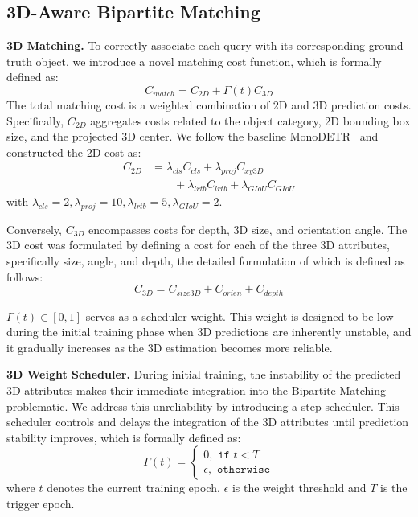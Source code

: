 \subsection{3D-Aware Bipartite Matching}
\textbf{3D Matching.} To correctly associate each query with its corresponding ground-truth object, we introduce a novel matching cost function, which is formally defined as:
\begin{equation}
    C_{match}=C_{2D} + \Gamma(t) C_{3D}
    \label{eq:matching_eq}
\end{equation}
The total matching cost is a weighted combination of 2D and 3D prediction costs. Specifically, $C_{2D}$ aggregates costs related to the object category, 2D bounding box size, and the projected 3D center. We follow the baseline MonoDETR~\cite{MonoDETR} and constructed the 2D cost as:
\begin{equation}
    \begin{aligned}
        C_{2D} & =\lambda_{cls}C_{cls} + \lambda_{proj}C_{xy3D} \\
        & \hspace{2em} + \lambda_{lrtb}C_{lrtb} + \lambda_{GIoU}C_{GIoU}
    \end{aligned}
\end{equation}
with $\lambda_{cls}=2, \lambda_{proj}=10, \lambda_{lrtb} = 5, \lambda_{GIoU} = 2$.

Conversely, $C_{3D}$ encompasses costs for depth, 3D size, and orientation angle. The 3D cost was formulated by defining a cost for each of the three 3D attributes, specifically size, angle, and depth, the detailed formulation of which is defined as follows:
\begin{equation}
    C_{3D} = C_{size3D} + C_{orien} + C_{depth}
\end{equation}

$\Gamma(t) \in [0, 1]$ serves as a scheduler weight. This weight is designed to be low during the initial training phase when 3D predictions are inherently unstable, and it gradually increases as the 3D estimation becomes more reliable.

\noindent\textbf{3D Weight Scheduler.} During initial training, the instability of the predicted 3D attributes makes their immediate integration into the Bipartite Matching problematic. We address this unreliability by introducing a step scheduler. This scheduler controls and delays the integration of the 3D attributes until prediction stability improves, which is formally defined as:
\begin{equation}
      \Gamma(t)=
      \left\{
      \begin{array}{l}
           0, \texttt{ if } t < T \\
           \epsilon, \texttt{ otherwise}
      \end{array}
      \right.
      \label{eq:3d_weight_scheduler}
\end{equation}
where $t$ denotes the current training epoch, $\epsilon$ is the weight threshold and $T$ is the trigger epoch.

